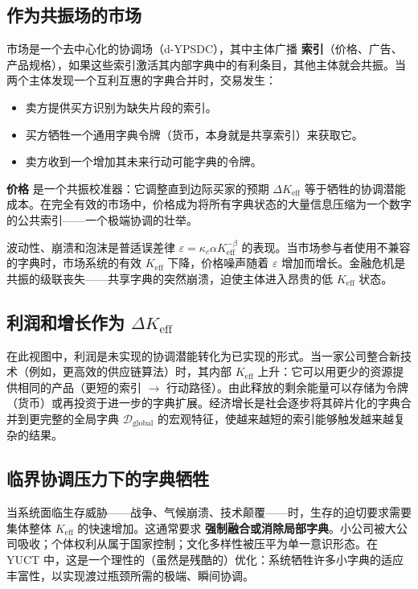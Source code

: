 \documentclass[12pt,a4paper]{article}
\newcommand{\Keff}{K_{\mathrm{eff}}}
\begin{document}
	\subsection{作为共振场的市场}
	
	市场是一个去中心化的协调场（d-YPSDC），其中主体广播 \textbf{索引}（价格、广告、产品规格），如果这些索引激活其内部字典中的有利条目，其他主体就会共振。当两个主体发现一个互利互惠的字典合并时，交易发生：
	\begin{itemize}[leftmargin=*]
		\item 卖方提供买方识别为缺失片段的索引。
		\item 买方牺牲一个通用字典令牌（货币，本身就是共享索引）来获取它。
		\item 卖方收到一个增加其未来行动可能字典的令牌。
	\end{itemize}
	\textbf{价格} 是一个共振校准器：它调整直到边际买家的预期 $\Delta\Keff$ 等于牺牲的协调潜能成本。在完全有效的市场中，价格成为将所有字典状态的大量信息压缩为一个数字的公共索引——一个极端协调的壮举。
	
	波动性、崩溃和泡沫是普适误差律 $\varepsilon = \kappa_c \alpha \Keff^{-\beta}$ 的表现。当市场参与者使用不兼容的字典时，市场系统的有效 $\Keff$ 下降，价格噪声随着 $\varepsilon$ 增加而增长。金融危机是共振的级联丧失——共享字典的突然崩溃，迫使主体进入昂贵的低 $\Keff$ 状态。
	
	\subsection{利润和增长作为 $\Delta\Keff$}
	
	在此视图中，利润是未实现的协调潜能转化为已实现的形式。当一家公司整合新技术（例如，更高效的供应链算法）时，其内部 $\Keff$ 上升：它可以用更少的资源提供相同的产品（更短的索引 $\rightarrow$ 行动路径）。由此释放的剩余能量可以存储为令牌（货币）或再投资于进一步的字典扩展。经济增长是社会逐步将其碎片化的字典合并到更完整的全局字典 $\mathcal{D}_{\text{global}}$ 的宏观特征，使越来越短的索引能够触发越来越复杂的结果。
	
	\subsection{临界协调压力下的字典牺牲}
	
	当系统面临生存威胁——战争、气候崩溃、技术颠覆——时，生存的迫切要求需要集体整体 $\Keff$ 的快速增加。这通常要求 \textbf{强制融合或消除局部字典}。小公司被大公司吸收；个体权利从属于国家控制；文化多样性被压平为单一意识形态。在 YUCT 中，这是一个理性的（虽然是残酷的）优化：系统牺牲许多小字典的适应丰富性，以实现渡过瓶颈所需的极端、瞬间协调。
	
\end{document}
